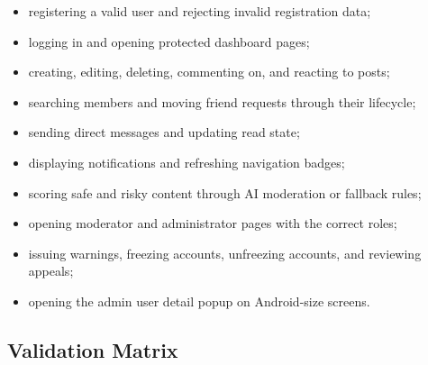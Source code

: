 \begin{itemize}
    \item registering a valid user and rejecting invalid registration data;
    \item logging in and opening protected dashboard pages;
    \item creating, editing, deleting, commenting on, and reacting to posts;
    \item searching members and moving friend requests through their lifecycle;
    \item sending direct messages and updating read state;
    \item displaying notifications and refreshing navigation badges;
    \item scoring safe and risky content through AI moderation or fallback rules;
    \item opening moderator and administrator pages with the correct roles;
    \item issuing warnings, freezing accounts, unfreezing accounts, and reviewing appeals;
    \item opening the admin user detail popup on Android-size screens.
\end{itemize}

\subsection{Validation Matrix}

